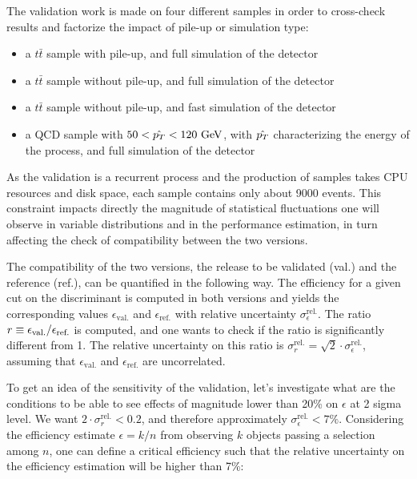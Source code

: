     The validation work is made on four different samples in order to cross-check results
    and factorize the impact of pile-up or simulation type:
    \begin{itemize}
        \item a $t\bar{t}$ sample with pile-up, and full simulation of the detector
        \item a $t\bar{t}$ sample without pile-up, and full simulation of the detector
        \item a $t\bar{t}$ sample without pile-up, and fast simulation of the detector
        \item a QCD sample with $50 < \hat{p_T} < 120~\text{GeV}$, with $\hat{p_T}$ characterizing
            the energy of the process, and full simulation of the detector
    \end{itemize}

    As the validation is a recurrent process and the production of samples takes CPU
    resources and disk space, each sample contains only about 9000 events. This constraint
    impacts directly the magnitude of statistical fluctuations one will observe in
    variable distributions and in the performance estimation, in turn affecting the check of compatibility
    between the two versions.

    The compatibility of the two versions, the release to be validated (val.) and the
    reference (ref.), can be quantified in the following way. The efficiency for a given
    cut on the discriminant is computed in both versions and yields the corresponding
    values $\epsilon_\text{val.}$ and $\epsilon_\text{ref.}$ with relative uncertainty
    $\sigma^\text{rel.}_\epsilon$. The ratio $r \equiv \epsilon_\text{val.}/\epsilon_\text{ref.}$
    is computed, and one wants to check if the ratio is significantly different from 1.
    The relative uncertainty on this ratio is $\sigma^\text{rel.}_r = \sqrt{2} \cdot \sigma^\text{rel.}_\epsilon$,
    assuming that $\epsilon_\text{val.}$ and $\epsilon_\text{ref.}$ are uncorrelated.

    To get an idea of the sensitivity of the validation, let's investigate what are the
    conditions to be able to see effects of magnitude lower than 20\% on $\epsilon$ at 2
    sigma level. We want $2 \cdot \sigma^\text{rel.}_r < 0.2$, and therefore approximately
    $\sigma^\text{rel.}_\epsilon < 7\%$. Considering the efficiency estimate $\epsilon
    = k/n$ from observing $k$ objects passing a selection among $n$, one can define a
    critical efficiency such that the relative uncertainty on the efficiency estimation
    will be higher than 7\%:

